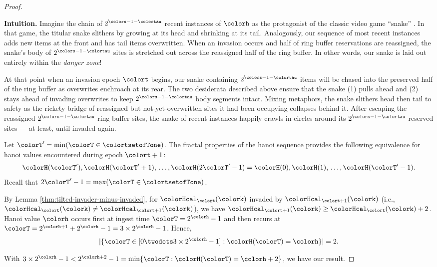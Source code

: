 \begin{proof}
\begin{mybox}
\textbf{Intuition.}
Imagine the chain of $2^{\colors - 1 - \colortau}$ recent instances of \hv{} $\colorh$ as the protagonist of the classic video game ``snake'' \citep{de2016complexity}.
In that game, the titular snake slithers by growing at its head and shrinking at its tail.
Analogously, our sequence of most recent \hv{} instances adds new items at the front and has tail items overwritten.
When an invasion occurs and half of ring buffer reservations are reassigned, the snake's body of $2^{\colors - 1 - \colortau}$ sites is stretched out across the reassigned half of the ring buffer.
In other words, our snake is laid out entirely within the \textit{danger zone}!

At that point when an invasion epoch $\colort$ begins, our snake containing $2^{\colors - 1 - \colortau}$ items will be chased into the preserved half of the ring buffer as overwrites enchroach at its rear.
The two desiderata described above ensure that the snake (1) pulls ahead and (2) stays ahead of invading overwrites to keep $2^{\colors - 1 - \colortau}$ body segments intact.
Mixing metaphors, the snake slithers head then tail to safety as the rickety bridge of reassigned but not-yet-overwritten sites it had been occupying collapses behind it.
After escaping the reassigned $2^{\colors - 1 - \colortau}$ ring buffer sites, the snake of recent \hv{} instances happily crawls in circles around its $2^{\colors - 1 - \colortau}$ reserved sites --- at least, until invaded again.
\end{mybox}

\begin{proofpart}
Let $\colorT' = \min(\colorT \in \colortsetofTone)$.
The fractal properties of the hanoi sequence provides the following equivalence for hanoi values encountered during epoch $\colort + 1$:
\begin{align*}
\colorH(\colorT'), \colorH(\colorT'+1), \,\ldots, \colorH(2\colorT' - 1) = \colorH(0), \colorH(1), \,\ldots, \colorH(\colorT' - 1).
\end{align*}
Recall that $2\colorT' - 1 = \max(\colorT \in \colortsetofTone)$.

By Lemma \ref{thm:tilted-invader-minus-invaded}, for \hv{} $\colorHcal_{\colort}(\colork)$ invaded by \hv{} $\colorHcal_{\colort + 1}(\colork)$ (i.e., $\colorHcal_{\colort}(\colork) \neq \colorHcal_{\colort + 1}(\colork)$), we have $\colorHcal_{\colort + 1}(\colork) \geq \colorHcal_{\colort}(\colork) + 2$.
Hanoi value $\colorh$ occurs first at ingest time $\colorT = 2^{\colorh} - 1$ and then recurs at $\colorT = 2^{\colorh + 1} + 2^{\colorh} - 1 = 3 \times 2^{\colorh} - 1$.
Hence,
\begin{align*}
|\{\colorT \in [0 \twodots 3 \times 2^{\colorh} - 1] : \colorH(\colorT) = \colorh\}| = 2.
\end{align*}
\end{proofpart}
With $3 \times 2^{\colorh} - 1 < 2^{\colorh + 2} - 1 = \min\{\colorT : \colorH(\colorT) = \colorh + 2\}$, we have our result.


\end{proof}
